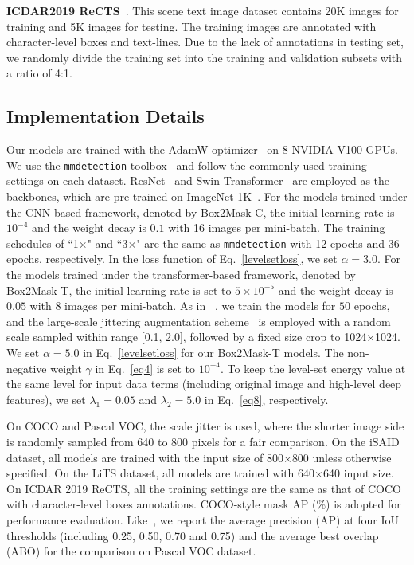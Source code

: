 \documentclass[12pt,onecolumn,letterpaper]{article}
\begin{document}
\textbf{ICDAR2019 ReCTS}~\cite{zhang2019icdar}. This scene text image dataset contains 20K images for training and 5K images for testing. The training images are annotated with character-level boxes and text-lines. Due to the lack of annotations in testing set, we randomly divide the training set into the training and validation subsets with a ratio of 4:1.

\subsection{Implementation Details}
Our models are trained with the AdamW optimizer~\cite{AdamW2017decoupled} on 8 NVIDIA V100 GPUs. 
We use the \texttt{mmdetection} toolbox~\cite{chen2019mmdetection} and follow the commonly used training settings on each dataset. ResNet~\cite{he2016deep} and Swin-Transformer~\cite{liu2021swin} are employed as the backbones, which are pre-trained on ImageNet-1K~\cite{IJCV2015imagenet}.
For the models trained under the CNN-based framework, denoted by Box2Mask-C, the initial learning rate is $10^{-4}$ and the weight decay is $0.1$ with 16 images per mini-batch. The training schedules of ``1$\times$" and ``3$\times$" are the same as \texttt{mmdetection} with 12 epochs and 36 epochs, respectively. In the loss function of Eq.~\ref{levelsetloss},  we set $\alpha=3.0$.
For the models trained under the transformer-based framework, denoted by Box2Mask-T, the initial learning rate is set to $5\times10^{-5}$ and the weight decay is $0.05$ with 8 images per mini-batch. As in ~\cite{cvpr2022mask2former}, we train the models for $50$ epochs, and the large-scale jittering augmentation scheme~\cite{cvpr2021simple} is employed with a random scale sampled within range [0.1, 2.0], followed by a fixed size crop to 1024$\times$1024.  We set $\alpha=5.0$ in Eq.~\ref{levelsetloss} for our Box2Mask-T models.
The non-negative weight $\gamma$ in Eq.~\ref{eq4} is set to $10^{-4}$. To keep the level-set energy value at the same level for input data terms (including original image and high-level deep features), we set ${\lambda _1} = 0.05 $ and ${\lambda _2} = 5.0 $ in Eq.~\ref{eq8}, respectively.

On COCO and Pascal VOC, the scale jitter is used,  where the shorter image side is randomly sampled from 640 to 800 pixels for a fair comparison. On the iSAID dataset, all models are trained with the input size of 800$\times$800 unless otherwise specified. On the LiTS dataset, all models are trained with 640$\times$640 input size.
On ICDAR 2019 ReCTS,  all the training settings are the same as that of COCO with character-level boxes annotations.
COCO-style mask AP ($\%$) is adopted for performance evaluation. Like~\cite{cvpr2021bbam, iccv2021discobox}, we report the average precision (AP) at four IoU thresholds (including 0.25, 0.50, 0.70 and 0.75) and the average best overlap (ABO) for the comparison on Pascal VOC dataset. 
\end{document}
